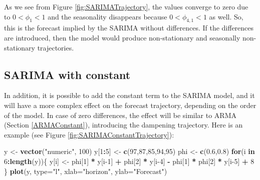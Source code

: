 \documentclass[]{book}
\newenvironment{Shaded}{\begin{snugshade}}{\end{snugshade}}
\newcommand{\ControlFlowTok}[1]{\textcolor[rgb]{0.13,0.29,0.53}{\textbf{#1}}}
\newcommand{\DataTypeTok}[1]{\textcolor[rgb]{0.13,0.29,0.53}{#1}}
\newcommand{\DecValTok}[1]{\textcolor[rgb]{0.00,0.00,0.81}{#1}}
\newcommand{\FloatTok}[1]{\textcolor[rgb]{0.00,0.00,0.81}{#1}}
\newcommand{\KeywordTok}[1]{\textcolor[rgb]{0.13,0.29,0.53}{\textbf{#1}}}
\newcommand{\NormalTok}[1]{#1}
\newcommand{\OperatorTok}[1]{\textcolor[rgb]{0.81,0.36,0.00}{\textbf{#1}}}
\newcommand{\StringTok}[1]{\textcolor[rgb]{0.31,0.60,0.02}{#1}}
\theoremstyle{definition}
\theoremstyle{definition}
\theoremstyle{definition}
\theoremstyle{definition}
\theoremstyle{remark}
\begin{document}
As we see from Figure \ref{fig:SARIMATrajectory}, the values converge to zero due to \(0<\phi_1<1\) and the seasonality disappears because \(0<\phi_{4,1}<1\) as well. So, this is the forecast implied by the SARIMA without differences. If the differences are introduced, then the model would produce non-stationary and seasonally non-stationary trajectories.

\hypertarget{sarima-with-constant}{%
\subsection{SARIMA with constant}\label{sarima-with-constant}}

In addition, it is possible to add the constant term to the SARIMA model, and it will have a more complex effect on the forecast trajectory, depending on the order of the model. In case of zero differences, the effect will be similar to ARMA (Section \ref{ARMAConstant}), introducing the dampening trajectory. Here is an example (see Figure \ref{fig:SARIMAConstantTrajectory}):

\begin{Shaded}
\begin{Highlighting}[]
\NormalTok{y <-}\StringTok{ }\KeywordTok{vector}\NormalTok{(}\StringTok{"numeric"}\NormalTok{, }\DecValTok{100}\NormalTok{)}
\NormalTok{y[}\DecValTok{1}\OperatorTok{:}\DecValTok{5}\NormalTok{] <-}\StringTok{ }\KeywordTok{c}\NormalTok{(}\DecValTok{97}\NormalTok{,}\DecValTok{87}\NormalTok{,}\DecValTok{85}\NormalTok{,}\DecValTok{94}\NormalTok{,}\DecValTok{95}\NormalTok{)}
\NormalTok{phi <-}\StringTok{ }\KeywordTok{c}\NormalTok{(}\FloatTok{0.6}\NormalTok{,}\FloatTok{0.8}\NormalTok{)}
\ControlFlowTok{for}\NormalTok{(i }\ControlFlowTok{in} \DecValTok{6}\OperatorTok{:}\KeywordTok{length}\NormalTok{(y))\{}
\NormalTok{    y[i] <-}\StringTok{ }\NormalTok{phi[}\DecValTok{1}\NormalTok{] }\OperatorTok{*}\StringTok{ }\NormalTok{y[i}\DecValTok{-1}\NormalTok{] }\OperatorTok{+}\StringTok{ }\NormalTok{phi[}\DecValTok{2}\NormalTok{] }\OperatorTok{*}\StringTok{ }\NormalTok{y[i}\DecValTok{-4}\NormalTok{] }\OperatorTok{-}
\StringTok{      }\NormalTok{phi[}\DecValTok{1}\NormalTok{] }\OperatorTok{*}\StringTok{ }\NormalTok{phi[}\DecValTok{2}\NormalTok{] }\OperatorTok{*}\StringTok{ }\NormalTok{y[i}\DecValTok{-5}\NormalTok{] }\OperatorTok{+}\StringTok{ }\DecValTok{8}
\NormalTok{\}}
\KeywordTok{plot}\NormalTok{(y, }\DataTypeTok{type=}\StringTok{"l"}\NormalTok{, }\DataTypeTok{xlab=}\StringTok{"horizon"}\NormalTok{, }\DataTypeTok{ylab=}\StringTok{"Forecast"}\NormalTok{)}
\end{Highlighting}
\end{Shaded}
\end{document}
